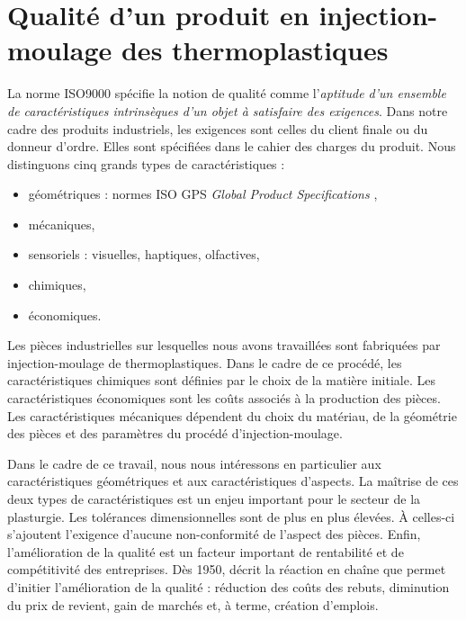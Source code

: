 \section{Qualité d'un produit en injection-moulage des thermoplastiques}

La norme ISO9000 \cite{ISO_9000_2015} spécifie la notion de qualité comme l'\textit{aptitude d'un ensemble de caractéristiques intrinsèques d'un objet à satisfaire des exigences}.
Dans notre cadre des produits industriels, les exigences sont celles du client finale ou du donneur d'ordre.
Elles sont spécifiées dans le cahier des charges du produit.
Nous distinguons cinq grands types de caractéristiques :
\begin{itemize}
	\item géométriques : normes ISO GPS \textit{Global Product Specifications} \cite{ISO_8015_2011},
	\item mécaniques,
	\item sensoriels : visuelles, haptiques, olfactives,
	\item chimiques,
	\item économiques.
\end{itemize}

Les pièces industrielles sur lesquelles nous avons travaillées sont fabriquées par injection-moulage de thermoplastiques.
Dans le cadre de ce procédé, les caractéristiques chimiques sont définies par le choix de la matière initiale.
Les caractéristiques économiques sont les coûts associés à la production des pièces.
Les caractéristiques mécaniques dépendent du choix du matériau, de la géométrie des pièces et des paramètres du procédé d'injection-moulage.

Dans le cadre de ce travail, nous nous intéressons en particulier aux caractéristiques géométriques et aux caractéristiques d'aspects.
La maîtrise de ces deux types de caractéristiques est un enjeu important pour le secteur de la plasturgie.
Les tolérances dimensionnelles sont de plus en plus élevées.
À celles-ci s'ajoutent l'exigence d'aucune non-conformité de l'aspect des pièces.
Enfin, l'amélioration de la qualité est un facteur important de rentabilité et de compétitivité des entreprises.
Dès 1950, \citeauthor{deming_quality_1982} \cite{deming_quality_1982} décrit la réaction en chaîne que permet d'initier l'amélioration de la qualité : réduction des coûts des rebuts, diminution du prix de revient, gain de marchés et, à terme, création d'emplois.

